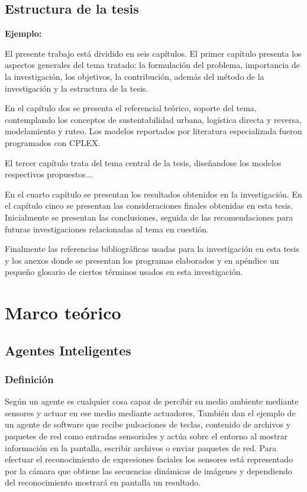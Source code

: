 \section{Estructura de la tesis}

{\bf Ejemplo:}\par
\vskip 0.1cm
El presente trabajo está dividido en seis capítulos. El primer capítulo presenta los aspectos generales del tema tratado: la formulación del problema, importancia de la investigación, los objetivos, la contribución, además del método de la investigación y la estructura de la tesis.

En el capítulo dos se presenta el referencial teórico, soporte del tema, contemplando los conceptos de sustentabilidad urbana, logística directa y reversa, modelamiento y ruteo. Los modelos reportados por literatura especializada fueron programados con CPLEX.

El tercer capítulo trata del tema central de la tesis, diseñandose los modelos respectivos propuestos...   

 En el cuarto capítulo se presentan los resultados obtenidos en la investigación. En el capítulo cinco se presentan las consideraciones finales obtenidas en esta tesis. Inicialmente se presentan las conclusiones, seguida de las recomendaciones para futuras investigaciones relacionadas al tema en cuestión.

Finalmente las referencias bibliográficas usadas para la investigación en esta tesis y los anexos donde se presentan los programas elaborados y en apéndice un pequeño glosario de ciertos términos usados en esta investigación.




\chapter{Marco teórico}

\section{Agentes Inteligentes}
\subsection{Definición}

Según \cite{Russel} un agente es cualquier cosa capaz de percibir su medio ambiente mediante sensores y actuar en ese medio mediante actuadores, También dan el ejemplo de  un agente de software que recibe pulsaciones de teclas, contenido de archivos y paquetes de red como entradas sensoriales y actúa sobre el entorno al mostrar información en la pantalla, escribir archivos o enviar paquetes de red. Para efectuar el reconocimiento de expresiones faciales los sensores está representado por la cámara que obtiene las secuencias dinámicas de imágenes y dependiendo del reconocimiento mostrará en pantalla un resultado.

